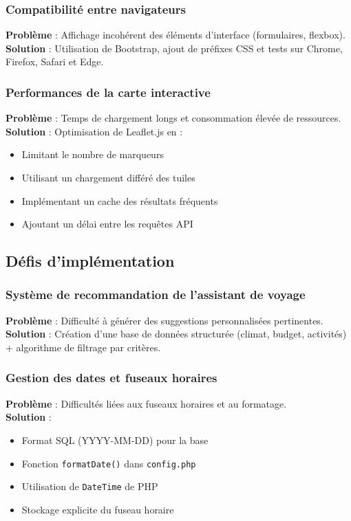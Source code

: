 \documentclass[a4paper,12pt]{article}
\begin{document}
\subsubsection{Compatibilité entre navigateurs}
\textbf{Problème} : Affichage incohérent des éléments d’interface (formulaires, flexbox).\\
\textbf{Solution} : Utilisation de Bootstrap, ajout de préfixes CSS et tests sur Chrome, Firefox, Safari et Edge.

\subsubsection{Performances de la carte interactive}
\textbf{Problème} : Temps de chargement longs et consommation élevée de ressources.\\
\textbf{Solution} : Optimisation de Leaflet.js en :
\begin{itemize}
  \item Limitant le nombre de marqueurs
  \item Utilisant un chargement différé des tuiles
  \item Implémentant un cache des résultats fréquents
  \item Ajoutant un délai entre les requêtes API
\end{itemize}

\subsection{Défis d’implémentation}

\subsubsection{Système de recommandation de l’assistant de voyage}
\textbf{Problème} : Difficulté à générer des suggestions personnalisées pertinentes.\\
\textbf{Solution} : Création d’une base de données structurée (climat, budget, activités) + algorithme de filtrage par critères.

\subsubsection{Gestion des dates et fuseaux horaires}
\textbf{Problème} : Difficultés liées aux fuseaux horaires et au formatage.\\
\textbf{Solution} :
\begin{itemize}
  \item Format SQL (YYYY-MM-DD) pour la base
  \item Fonction \texttt{formatDate()} dans \texttt{config.php}
  \item Utilisation de \texttt{DateTime} de PHP
  \item Stockage explicite du fuseau horaire
\end{itemize}
\end{document}
